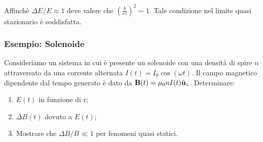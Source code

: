 Affinch\`e $\Delta E/E \approx1$ deve valere che $\left(\frac{b}{c \tau}\right)^2 \sim 1$. Tale condizione nel limite quasi stazionario \`e soddisfatta.

\subsubsection{Esempio: Solenoide }
Consideriamo un sistema in cui \`e presente un solenoide con una densit\`a di spire $n$ attraversato da una corrente alternata $I(t) = I_0 \cos(\omega t)$. Il campo magnetico dipendente dal tempo generato \`e dato da $\bold{B}(t) = \mu_0 n I(t) \hat{\bold{u}}_z$. Determinare:
\begin{enumerate}
	\item  $E(t)$ in funzione di r;
	\item $\Delta B(t)$ dovuto a $E(t)$;
	\item Mostrare che $\Delta B /B \ll 1$ per fenomeni quasi statici.
\end{enumerate}

